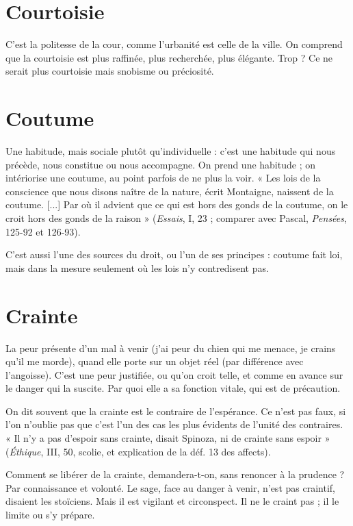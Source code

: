 \section{Courtoisie}
C'est la politesse de la cour, comme l’urbanité est celle de
la ville. On comprend que la courtoisie est plus raffinée,
plus recherchée, plus élégante. Trop ? Ce ne serait plus courtoisie mais snobisme
ou préciosité.

\section{Coutume}
Une habitude, mais sociale plutôt qu’individuelle : c’est une
habitude qui nous précède, nous constitue ou nous accompagne.
On prend une habitude ; on intériorise une coutume, au point parfois
de ne plus la voir. « Les lois de la conscience que nous disons naître de la
nature, écrit Montaigne, naissent de la coutume. [...] Par où il advient que ce
qui est hors des gonds de la coutume, on le croit hors des gonds de la raison »
({\it Essais}, I, 23 ; comparer avec Pascal, {\it Pensées}, 125-92 et 126-93).

C’est aussi l’une des sources du droit, ou l’un de ses principes : coutume
fait loi, mais dans la mesure seulement où les lois n’y contredisent pas.

\section{Crainte}
La peur présente d’un mal à venir (j'ai peur du chien qui me
menace, je crains qu’il me morde), quand elle porte sur un objet
réel (par différence avec l'angoisse). C’est une peur justifiée, ou qu’on croit
telle, et comme en avance sur le danger qui la suscite. Par quoi elle a sa fonction
vitale, qui est de précaution.

On dit souvent que la crainte est le contraire de l’espérance. Ce n’est pas
faux, si l’on n’oublie pas que c’est l’un des cas les plus évidents de l’unité des
contraires. « Il n’y a pas d’espoir sans crainte, disait Spinoza, ni de crainte sans
espoir » ({\it Éthique}, III, 50, scolie, et explication de la déf. 13 des affects).

Comment se libérer de la crainte, demandera-t-on, sans renoncer à la
prudence ? Par connaissance et volonté. Le sage, face au danger à venir, n’est
pas craintif, disaient les stoïciens. Mais il est vigilant et circonspect. Il ne le
craint pas ; il le limite ou s’y prépare.

